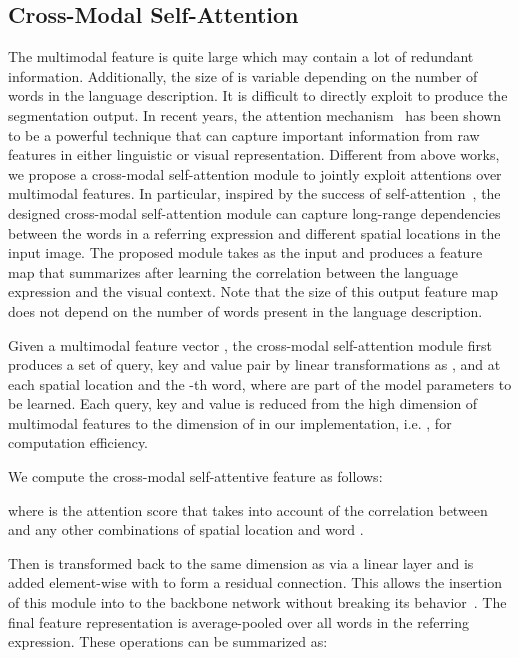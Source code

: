 \documentclass[10pt,twocolumn,letterpaper]{article}
\begin{document}
\subsection{Cross-Modal Self-Attention}\label{sec:msa}
The multimodal feature  is quite large which may contain a lot of redundant information. Additionally, the size of  is variable depending on the number of words in the language description. It is difficult to directly exploit  to produce the segmentation output. In recent years, the attention mechanism~\cite{hu2017modeling,shi2018key,vaswani2017attention,xu2015show,yu2018mattnet} has been shown to be a powerful technique that can capture important information from raw features in either linguistic or visual representation. Different from above works, we propose a cross-modal self-attention module to jointly exploit attentions over multimodal features. In particular, inspired by the success of self-attention~\cite{vaswani2017attention,wang2018non}, the designed cross-modal self-attention module can capture long-range dependencies between the words in a referring expression and different spatial locations in the input image. The proposed module takes  as the input and produces a feature map that summarizes  after learning the correlation between the language expression and the visual context. Note that the size of this output feature map does not depend on the number of words present in the language description. 
 
 








Given a multimodal feature vector , the cross-modal self-attention module first produces a set of query, key and value pair by linear transformations as  ,  and   at each spatial location  and the -th word, where  are part of the model parameters to be learned. Each query, key and value is reduced from the high dimension of multimodal features to the dimension of  in our implementation, i.e. , for computation efficiency.

We compute the cross-modal self-attentive feature  as follows: 

where  is the attention score that takes into account of the correlation between  and any other combinations of spatial location and word .

Then  is transformed back to the same dimension as  via a linear layer and is added element-wise with  to form a residual connection. This allows the insertion of this module into to the backbone network without breaking its  behavior~\cite{he2016deep}. The final feature representation is average-pooled over all words in the referring expression. These operations can be summarized as:
\end{document}
